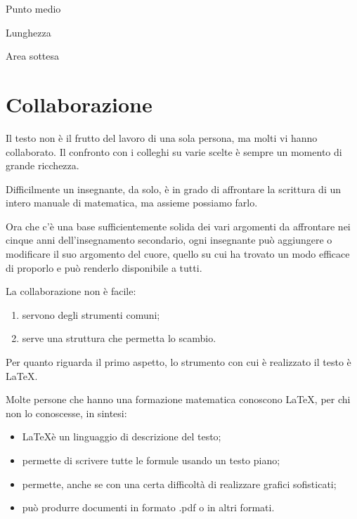 \documentclass[a4paper,10pt]{article}
\begin{document}
\noindent \begin{minipage}[t]{.36\textwidth}
\begin{center}
Punto medio

\scalebox{.6}{\puntomedio}
\end{center}
\end{minipage}
\begin{minipage}[t]{.33\textwidth}
\begin{center}
Lunghezza

\scalebox{.6}{\lungseg}
\end{center}
\end{minipage}
\begin{minipage}[t]{.33\textwidth}
\begin{center}
Area sottesa

\scalebox{.6}{\areasottesauno}
\end{center}
\end{minipage}


\section{Collaborazione}

Il testo non è il frutto del lavoro di una sola persona, ma molti vi hanno 
collaborato.
Il confronto con i colleghi su varie scelte è sempre un momento di grande 
ricchezza.

Difficilmente un insegnante, da solo, è in grado di affrontare la scrittura 
di un intero manuale di matematica, ma assieme possiamo farlo.

Ora che c'è una base sufficientemente solida dei vari argomenti da 
affrontare nei cinque anni dell'insegnamento secondario, ogni insegnante 
può aggiungere o modificare il suo argomento del cuore, quello su cui ha 
trovato un modo efficace di proporlo e può renderlo disponibile a tutti.

La collaborazione non è facile:
\begin{enumerate} [noitemsep]
\item servono degli strumenti comuni;
\item serve una struttura che permetta lo scambio.
\end{enumerate}

Per quanto riguarda il primo aspetto, lo strumento con cui è realizzato il 
testo è \LaTeX.

Molte persone che hanno una formazione matematica conoscono \LaTeX, 
per chi non lo conoscesse, in sintesi:
\begin{itemize} [noitemsep]
\item \LaTeX è un linguaggio di descrizione del testo; 
\item permette di scrivere tutte le formule usando un testo piano;
\item permette, anche se con una certa difficoltà di realizzare grafici 
sofisticati;
\item può produrre documenti in formato .pdf o in altri formati.
\end{itemize}
\end{document}
